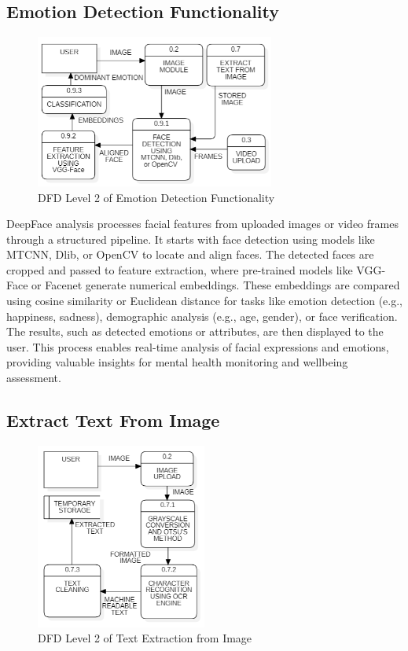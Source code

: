 \subsection{Emotion Detection Functionality}

\begin{figure}[h!]  
    \centering
    \includegraphics[width=0.7\textwidth]{Images/DFD L2 EMOTION.png}  
    \caption{DFD Level 2 of Emotion Detection Functionality}
    \label{dfdl14456}  %
\end{figure}

\noindent
DeepFace analysis processes facial features from uploaded images or video frames through a structured pipeline. It starts with face detection using models like MTCNN, Dlib, or OpenCV to locate and align faces. The detected faces are cropped and passed to feature extraction, where pre-trained models like VGG-Face or Facenet generate numerical embeddings. These embeddings are compared using cosine similarity or Euclidean distance for tasks like emotion detection (e.g., happiness, sadness), demographic analysis (e.g., age, gender), or face verification. The results, such as detected emotions or attributes, are then displayed to the user. This process enables real-time analysis of facial expressions and emotions, providing valuable insights for mental health monitoring and wellbeing assessment.

\pagebreak

\subsection{Extract Text From Image}

\begin{figure}[h!]  
    \centering
    \includegraphics[width=0.5\textwidth]{Images/DFD L2 TEXT EXTRACT.png}  
    \caption{DFD Level 2 of Text Extraction from Image}
    \label{dfdl13456}  %
\end{figure}

